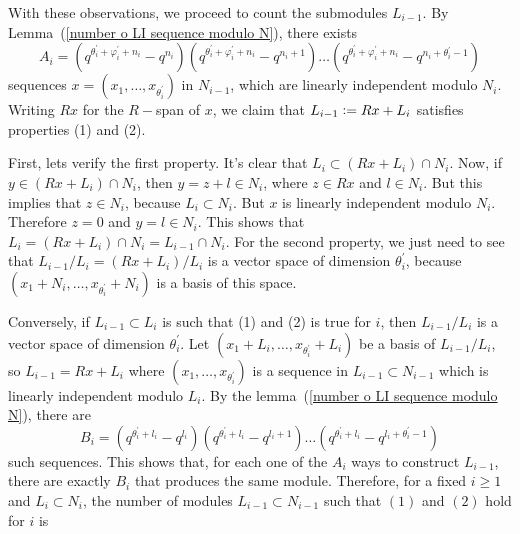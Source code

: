 With these observations, we proceed to count the submodules $L_{i-1}$. By Lemma~(\ref{number o LI sequence modulo N}), there exists
\begin{equation}
   A_i=(q^{\theta_i^\prime+\varphi_i^\prime+n_{i}}-q^{n_{i}})(q^{\theta_i^\prime+\varphi_i^\prime+n_{i}}-q^{n_{i}+1})\dots(q^{\theta_i^\prime+\varphi_i^\prime+n_{i}}-q^{n_{i}+\theta_i^\prime-1})
\end{equation}
sequences $x=(x_1,\dots,x_{\theta_i^\prime})$ in $N_{i-1}$, which are linearly independent modulo $N_i$. Writing $Rx$ for the $R-$span of $x$, we claim that $L_{i-1}\bydef Rx+L_i$ satisfies properties (1) and (2). \par
First, lets verify the first property. It's clear that $L_i\subset (Rx+L_i)\cap N_i$. Now, if $y\in (Rx+L_i)\cap N_i$, then $y=z+l\in N_i$, where $z\in Rx$ and $l\in N_i$. But this implies that $z\in N_i$, because $L_i\subset N_i$. But $x$ is linearly independent modulo $N_i$. Therefore $z=0$ and $y=l\in N_i$. This shows that $L_i=(Rx+L_i)\cap N_i=L_{i-1}\cap N_i$. For the second property, we just need to see that $L_{i-1}/L_i=(Rx+L_i)/L_i$ is a vector space of dimension $\theta_i^\prime$, because $(x_1+N_i,\dots, x_{\theta_i^\prime}+N_i)$ is a basis of this space.\par
Conversely, if $L_{i-1}\subset L_i$ is such that (1) and (2) is true for $i$, then $L_{i-1}/L_i$ is a vector space of dimension $\theta_i^\prime$. Let $(x_1+L_i,\dots, x_{\theta_i^\prime}+L_i)$ be a basis of $L_{i-1}/L_i$, so $L_{i-1}=Rx+L_i$ where $(x_1,\dots,x_{\theta_i^\prime})$ is a sequence in $L_{i-1}\subset N_{i-1}$ which is linearly independent modulo $L_i$. By the lemma~(\ref{number o LI sequence modulo N}), there are 
\begin{equation}
      B_i=(q^{\theta_i^\prime+l_{i}}-q^{l_{i}})(q^{\theta_i^\prime+l_{i}}-q^{l_{i}+1})\dots(q^{\theta_i^\prime+l_{i}}-q^{l_{i}+\theta_i^\prime-1})
\end{equation}
such sequences. This shows that, for each one of the $A_i$ ways to construct $L_{i-1}$, there are exactly $B_i$ that produces the same module. Therefore, for a fixed $i\geq1$ and $L_i\subset N_i$, the number of modules $L_{i-1}\subset N_{i-1}$ such that $(1)$ and $(2)$ hold for $i$ is

